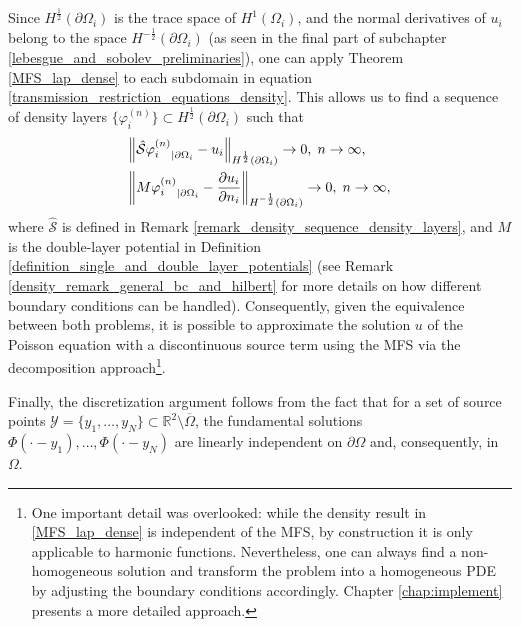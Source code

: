 Since \(H^\frac{1}{2}(\partial \Omega_i)\) is the trace space of \(H^1(\Omega_i)\), and the normal derivatives of \(u_i\) belong to the space \(H^{-\frac{1}{2}}(\partial\Omega_i)\) (as seen in the final part of subchapter \ref{lebesgue_and_sobolev_preliminaries}), one can apply Theorem \ref{MFS_lap_dense} to each subdomain in equation \eqref{transmission_restriction_equations_density}. This allows us to find a sequence of density layers \(\{\varphi^{(n)}_i\} \subset H^{\frac{1}{2}}(\partial\Omega_i)\) such that
\begin{align*}
    &\norm{{\hat{\mathcal{S}}\varphi^{(n)}_i}_{|\partial\Omega_i} - u_i}_{H^\frac{1}{2}(\partial\Omega_i)} \rightarrow 0, \; n \rightarrow \infty,\\
    &\norm{{M\varphi^{(n)}_i}_{|\partial\Omega_i} - \frac{\partial u_i}{\partial n_i}}_{H^{-\frac{1}{2}}(\partial\Omega_i)} \rightarrow 0, \; n \rightarrow \infty,
\end{align*}
where \(\hat{\mathcal{S}}\) is defined in Remark \ref{remark_density_sequence_density_layers}, and \(M\) is the double-layer potential in Definition \ref{definition_single_and_double_layer_potentials} (see Remark \ref{density_remark_general_bc_and_hilbert} for more details on how different boundary conditions can be handled). Consequently, given the equivalence between both problems, it is possible to approximate the solution \(u\) of the Poisson equation with a discontinuous source term using the \ac{MFS} via the decomposition approach\footnote{One important detail was overlooked: while the density result in \ref{MFS_lap_dense} is independent of the \ac{MFS}, by construction it is only applicable to harmonic functions. Nevertheless, one can always find a non-homogeneous solution and transform the problem into a homogeneous \ac{PDE} by adjusting the boundary conditions accordingly. Chapter \ref{chap:implement} presents a more detailed approach.}.

Finally, the discretization argument follows from the fact that for a set of source points \(\mathcal{Y} = \{y_1,\dots, y_N\} \subset \mathbb{R}^2\setminus\overline{\Omega}\), the fundamental solutions \(\Phi(\cdot-y_1),\dots,\Phi(\cdot-y_N)\) are linearly independent on \(\partial \Omega\) and, consequently, in \(\Omega\).

